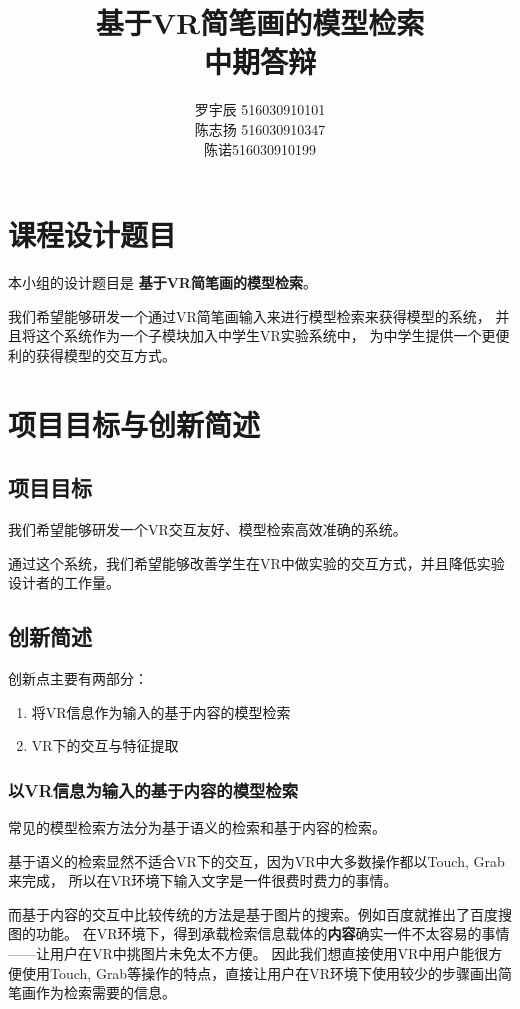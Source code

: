 \documentclass{article}
\title{基于VR简笔画的模型检索 \\ 中期答辩}
\author{
罗宇辰 516030910101 \\
陈志扬 516030910347 \\
陈\quad 诺516030910199
}
\begin{document}
\maketitle
\tableofcontents

\clearpage
\newpage


\section{课程设计题目}
本小组的设计题目是 \textbf{基于VR简笔画的模型检索}。

我们希望能够研发一个通过VR简笔画输入来进行模型检索来获得模型的系统，
并且将这个系统作为一个子模块加入中学生VR实验系统中，
为中学生提供一个更便利的获得模型的交互方式。

\section{项目目标与创新简述}
\subsection{项目目标}
我们希望能够研发一个VR交互友好、模型检索高效准确的系统。

通过这个系统，我们希望能够改善学生在VR中做实验的交互方式，并且降低实验设计者的工作量。 
\subsection{创新简述}
创新点主要有两部分：
\begin{enumerate}
    \item 将VR信息作为输入的基于内容的模型检索
    \item VR下的交互与特征提取
\end{enumerate}

\subsubsection{以VR信息为输入的基于内容的模型检索}
常见的模型检索方法分为基于语义的检索和基于内容的检索。 

基于语义的检索显然不适合VR下的交互，因为VR中大多数操作都以Touch, Grab来完成，
所以在VR环境下输入文字是一件很费时费力的事情。 

而基于内容的交互中比较传统的方法是基于图片的搜索。例如百度就推出了百度搜图的功能。
在VR环境下，得到承载检索信息载体的\textbf{内容}确实一件不太容易的事情——让用户在VR中挑图片未免太不方便。
因此我们想直接使用VR中用户能很方便使用Touch, Grab等操作的特点，直接让用户在VR环境下使用较少的步骤画出简笔画作为检索需要的信息。
\end{document}
